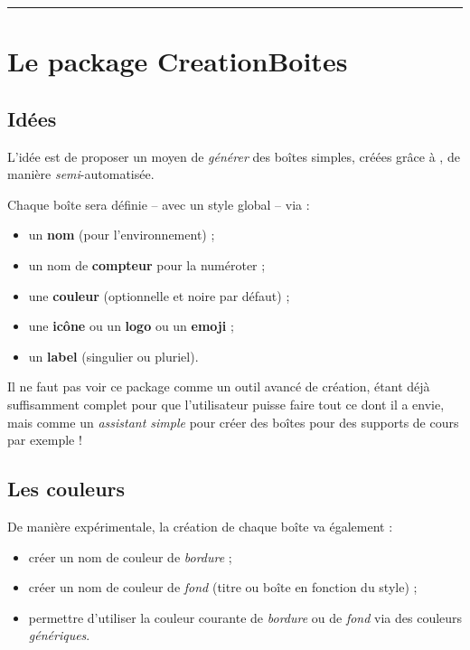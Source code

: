 \documentclass[french,11pt,a4paper]{article}
\begin{document}
\hrule

\pagebreak

\section{Le package CreationBoites}

\subsection{Idées}

L'idée est de proposer un moyen de \textit{générer} des boîtes simples, créées grâce à , de manière \textit{semi}-automatisée.

\smallskip

Chaque boîte sera définie -- avec un style global -- via :

\begin{itemize}
	\item un \textbf{nom} (pour l'environnement) ;
	\item un nom de \textbf{compteur} pour la numéroter ;
	\item une \textbf{couleur} (optionnelle et noire par défaut) ;
	\item une \textbf{icône} ou un \textbf{logo} ou un \textbf{emoji} ;
	\item un \textbf{label} (singulier ou pluriel).
\end{itemize}

\medskip

Il ne faut pas voir ce package comme un outil avancé de création,  étant déjà suffisamment complet pour que l'utilisateur puisse faire tout ce dont il a envie, mais comme un \textit{assistant simple} pour créer des boîtes pour des supports de cours par exemple !

\subsection{Les couleurs}

De manière expérimentale, la création de chaque boîte va également :

\begin{itemize}
	\item créer un nom de couleur de \textit{bordure} ;
	\item créer un nom de couleur de \textit{fond} (titre ou boîte en fonction du style) ;
	\item permettre d'utiliser la couleur courante de \textit{bordure} ou de \textit{fond} via des couleurs \textit{génériques}.
\end{itemize}
\end{document}
